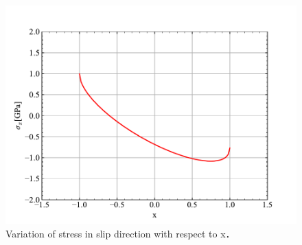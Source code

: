 \begin{figure}[htbp]
    \centering %
    \includegraphics[width=100truemm,clip]{fig/fig_Sigma_X.pdf}
    \caption{Variation of stress in slip direction with respect to x．}
    \label{fig:fig_Sigma_X}
\end{figure}



